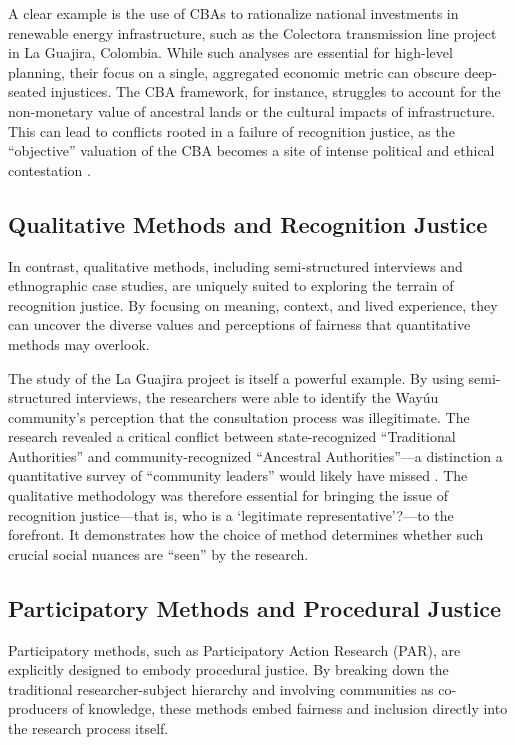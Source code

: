 \documentclass[11pt, letterpaper]{article}
\begin{document}
A clear example is the use of CBAs to rationalize national investments in renewable energy infrastructure, such as the Colectora transmission line project in La Guajira, Colombia. While such analyses are essential for high-level planning, their focus on a single, aggregated economic metric can obscure deep-seated injustices. The CBA framework, for instance, struggles to account for the non-monetary value of ancestral lands or the cultural impacts of infrastructure. This can lead to conflicts rooted in a failure of recognition justice, as the ``objective'' valuation of the CBA becomes a site of intense political and ethical contestation \citep{vega-araujo_heffron_2022}.

\subsection*{Qualitative Methods and Recognition Justice}
In contrast, qualitative methods, including semi-structured interviews and ethnographic case studies, are uniquely suited to exploring the terrain of recognition justice. By focusing on meaning, context, and lived experience, they can uncover the diverse values and perceptions of fairness that quantitative methods may overlook.

The study of the La Guajira project is itself a powerful example. By using semi-structured interviews, the researchers were able to identify the Wayúu community's perception that the consultation process was illegitimate. The research revealed a critical conflict between state-recognized ``Traditional Authorities'' and community-recognized ``Ancestral Authorities''---a distinction a quantitative survey of ``community leaders'' would likely have missed \citep{vega-araujo_heffron_2022}. The qualitative methodology was therefore essential for bringing the issue of recognition justice---that is, who is a `legitimate representative'?---to the forefront. It demonstrates how the choice of method determines whether such crucial social nuances are ``seen'' by the research.

\subsection*{Participatory Methods and Procedural Justice}
Participatory methods, such as Participatory Action Research (PAR), are explicitly designed to embody procedural justice. By breaking down the traditional researcher-subject hierarchy and involving communities as co-producers of knowledge, these methods embed fairness and inclusion directly into the research process itself.
\end{document}
